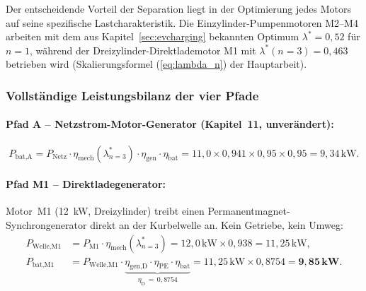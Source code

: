 ﻿\documentclass[a4paper,12pt]{article}
\begin{document}
Der entscheidende Vorteil der Separation liegt in der Optimierung jedes
Motors auf seine spezifische Lastcharakteristik. Die Einzylinder-Pumpenmotoren
M2--M4 arbeiten mit dem aus Kapitel~\ref{sec:evcharging} bekannten Optimum
$\lambda^* = 0{,}52$ für $n=1$, während der Dreizylinder-Direktlademotor M1
mit $\lambda^*(n=3) = 0{,}463$ betrieben wird (Skalierungsformel
(\ref{eq:lambda_n}) der Hauptarbeit).

\subsubsection{Vollständige Leistungsbilanz der vier Pfade}

\paragraph{Pfad A -- Netzstrom-Motor-Generator (Kapitel~11, unverändert):}
\begin{equation}
  P_\text{bat,A}
    = P_\text{Netz} \cdot \eta_\text{mech}(\lambda^*_{n=3})
      \cdot \eta_\text{gen} \cdot \eta_\text{bat}
    = 11{,}0 \times 0{,}941 \times 0{,}95 \times 0{,}95
    = 9{,}34\,\text{kW}.
  \label{eq:P_bat_A_4mot}
\end{equation}

\paragraph{Pfad M1 -- Direktladegenerator:}
Motor~M1 (12~kW, Dreizylinder) treibt einen
Permanentmagnet-Synchrongenerator direkt an der Kurbelwelle an.
Kein Getriebe, kein Umweg:
\begin{align}
  P_\text{Welle,M1}
    &= P_\text{M1} \cdot \eta_\text{mech}(\lambda^*_{n=3})
     = 12{,}0\,\text{kW} \times 0{,}938
     = 11{,}25\,\text{kW},
  \label{eq:P_welle_M1_4mot} \\[4pt]
  P_\text{bat,M1}
    &= P_\text{Welle,M1}
       \cdot \underbrace{\eta_\text{gen,D} \cdot \eta_\text{PE}
                         \cdot \eta_\text{bat}}_{\eta_\text{D}\,=\,0{,}8754}
     = 11{,}25\,\text{kW} \times 0{,}8754
     = \mathbf{9{,}85\,\text{kW}}.
  \label{eq:P_bat_M1_4mot}
\end{align}
\end{document}

